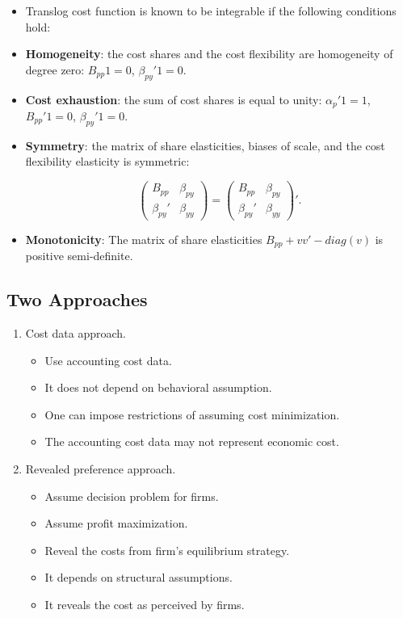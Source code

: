 \documentclass[]{book}
\providecommand{\tightlist}{%
  \setlength{\itemsep}{0pt}\setlength{\parskip}{0pt}}
\theoremstyle{definition}
\theoremstyle{definition}
\theoremstyle{definition}
\theoremstyle{remark}
\begin{document}
\begin{itemize}
\tightlist
\item
  Translog cost function is known to be integrable if the following
  conditions hold:
\item
  \textbf{Homogeneity}: the cost shares and the cost flexibility are
  homogeneity of degree zero: \(B_{pp}1 = 0\), \(\beta_{py}'1 = 0\).
\item
  \textbf{Cost exhaustion}: the sum of cost shares is equal to unity:
  \(\alpha_p'1 = 1\), \(B_{pp}'1 = 0\), \(\beta_{py}'1 = 0\).
\item
  \textbf{Symmetry}: the matrix of share elasticities, biases of scale,
  and the cost flexibility elasticity is symmetric:

  \begin{equation}
  \begin{pmatrix}
  B_{pp} & \beta_{py}\\
  \beta_{py}' & \beta_{yy}
  \end{pmatrix}
  =
  \begin{pmatrix}
  B_{pp} & \beta_{py}\\
  \beta_{py}' & \beta_{yy}
  \end{pmatrix}'.
  \end{equation}
\item
  \textbf{Monotonicity}: The matrix of share elasticities
  \(B_{pp} + vv' - diag(v)\) is positive semi-definite.
\end{itemize}

\subsection{Two Approaches}\label{two-approaches}

\begin{enumerate}
\def\labelenumi{\arabic{enumi}.}
\tightlist
\item
  Cost data approach.

  \begin{itemize}
  \tightlist
  \item
    Use accounting cost data.
  \item
    It does not depend on behavioral assumption.
  \item
    One can impose restrictions of assuming cost minimization.
  \item
    The accounting cost data may not represent economic cost.
  \end{itemize}
\item
  Revealed preference approach.

  \begin{itemize}
  \tightlist
  \item
    Assume decision problem for firms.
  \item
    Assume profit maximization.
  \item
    Reveal the costs from firm's equilibrium strategy.
  \item
    It depends on structural assumptions.
  \item
    It reveals the cost as perceived by firms.
  \end{itemize}
\end{enumerate}
\end{document}

